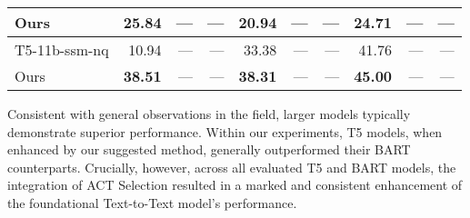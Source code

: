 \begin{table*}[ht]
{\begin{tabular}{lrrrrrrrrr}
    Ours      & \textbf{25.84}                                                         & ---                                                              & ---                                                                 & \textbf{20.94}                                                         & ---                                                              & ---                                                                 & \textbf{24.71}                                                         & ---                                                              & ---                                                                 \\ \hline
    T5-11b-ssm-nq          & 10.94                                                                  & ---                                                              & ---                                                                 & 33.38                                                                  & ---                                                              & ---                                                                 & 41.76                                                                  & ---                                                              & ---                                                                 \\ 
    Ours  & \textbf{38.51}                                                         & ---                                                              & ---                                                                 & \textbf{38.31}                                                         & ---                                                              & ---                                                                 & \textbf{45.00}                                                         & ---                                                              & ---                                                                 \\ \hline
    \end{tabular}
    }
\end{table*}


Consistent with general observations in the field, larger models typically demonstrate superior performance. Within our experiments, T5 models, when enhanced by our suggested method, generally outperformed their BART counterparts. Crucially, however, across all evaluated T5 and BART models, the integration of ACT Selection resulted in a marked and consistent enhancement of the foundational Text-to-Text model's performance.

